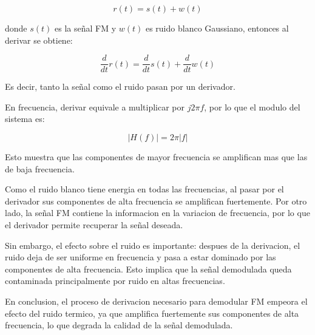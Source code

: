 \documentclass{article}
\begin{document}
\[
r(t)=s(t)+w(t)
\]

donde \(s(t)\) es la señal FM y \(w(t)\) es ruido blanco Gaussiano, entonces al derivar se obtiene:

\[
\frac{d}{dt}r(t)=\frac{d}{dt}s(t)+\frac{d}{dt}w(t)
\]

Es decir, tanto la señal como el ruido pasan por un derivador.

En frecuencia, derivar equivale a multiplicar por \(j2\pi f\), por lo que el modulo del sistema es:

\[
|H(f)|=2\pi |f|
\]

Esto muestra que las componentes de mayor frecuencia se amplifican mas que las de baja frecuencia.

Como el ruido blanco tiene energia en todas las frecuencias, al pasar por el derivador sus componentes de alta frecuencia se amplifican fuertemente. Por otro lado, la señal FM contiene la informacion en la variacion de frecuencia, por lo que el derivador permite recuperar la señal deseada.

Sin embargo, el efecto sobre el ruido es importante: despues de la derivacion, el ruido deja de ser uniforme en frecuencia y pasa a estar dominado por las componentes de alta frecuencia. Esto implica que la señal demodulada queda contaminada principalmente por ruido en altas frecuencias.

En conclusion, el proceso de derivacion necesario para demodular FM empeora el efecto del ruido termico, ya que amplifica fuertemente sus componentes de alta frecuencia, lo que degrada la calidad de la señal demodulada.
\end{document}
